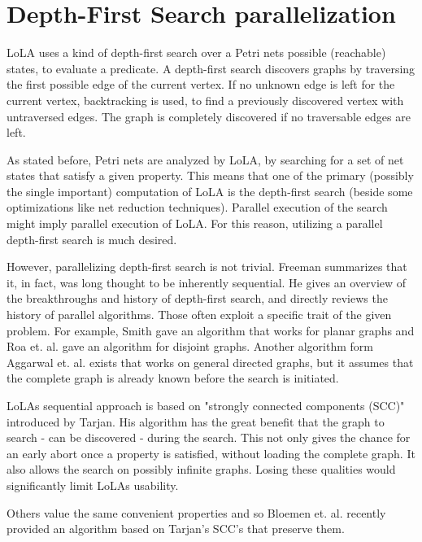\section{Depth-First Search parallelization}
LoLA uses a kind of depth-first search over a Petri nets possible (reachable) states, to evaluate a predicate. A depth-first search discovers graphs\cite[chapter~1]{bondy1976graph} by traversing the first possible edge of the current vertex. If no unknown edge is left for the current vertex, backtracking\cite{golomb1965backtrack} is used, to find a previously discovered vertex with untraversed edges. The graph is completely discovered if no traversable edges are left.

As stated before, Petri nets are analyzed by LoLA, by searching for a set of net states that satisfy a given property. This means that one of the primary (possibly the single important) computation of LoLA is the depth-first search (beside some optimizations like net reduction techniques). Parallel execution of the search might imply parallel execution of LoLA. For this reason, utilizing a parallel depth-first search is much desired.

However, parallelizing depth-first search is not trivial. Freeman summarizes that it, in fact, was long thought to be inherently sequential\cite{freeman1991parallel}. He gives an overview of the breakthroughs and history of depth-first search, and  directly reviews the history of parallel algorithms. Those often exploit a specific trait of the given problem. For example, Smith gave an algorithm that works for planar graphs\cite{smith1986parallel} and Roa et. al. gave an algorithm for disjoint graphs\cite{rao1987parallel}. Another algorithm form Aggarwal et. al. exists that works on general directed graphs\cite{Aggarwal:1989:PDS:73007.73035}, but it assumes that the complete graph is already known before the search is initiated.

LoLAs sequential approach is based on "strongly connected components (SCC)" introduced by Tarjan\cite{tarjan1972depth}. His algorithm has the great benefit that the graph to search - can be discovered - during the search. This not only gives the chance for an early abort once a property is satisfied, without loading the complete graph. It also allows the search on possibly infinite graphs. Losing these qualities would significantly limit LoLAs usability.

Others value the same convenient properties and so Bloemen et. al. recently provided an algorithm based on Tarjan's SCC's that preserve them\cite{bloemen2016multi}.

